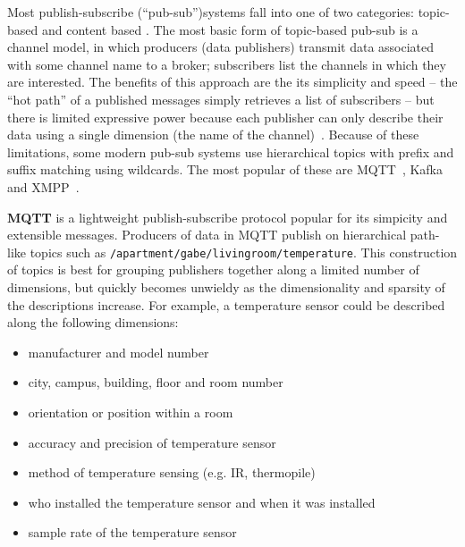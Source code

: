 Most publish-subscribe (``pub-sub'')systems fall into one of two categories: topic-based and content based \cite{eugster2003many}.
The most basic form of topic-based pub-sub is a channel model, in which producers (data publishers) transmit data associated with some channel name to a broker; subscribers list the channels in which they are interested.
The benefits of this approach are the its simplicity and speed -- the ``hot path'' of a published messages simply retrieves a list of subscribers -- but there is limited expressive power because each publisher can only describe their data using a single dimension (the name of the channel)~\cite{redis}.
Because of these limitations, some modern pub-sub systems use hierarchical topics with prefix and suffix matching using wildcards. The most popular of these are MQTT~\cite{locke2010mq}, Kafka~\cite{kreps2011kafka} and XMPP~\cite{saint2011extensible}.


\textbf{MQTT} is a lightweight publish-subscribe protocol popular for its simpicity and extensible messages.
Producers of data in MQTT publish on hierarchical path-like topics such as \texttt{/apartment/gabe/livingroom/temperature}.
This construction of topics is best for grouping publishers together along a limited number of dimensions, but quickly becomes unwieldy as the dimensionality and sparsity of the descriptions increase.
For example, a temperature sensor could be described along the following dimensions:

\begin{itemize}
\item manufacturer and model number
\item city, campus, building, floor and  room number
\item orientation or position within a room
\item accuracy and precision of temperature sensor
\item method of temperature sensing (e.g. IR, thermopile)
\item who installed the temperature sensor and when it was installed
\item sample rate of the temperature sensor
\end{itemize}


